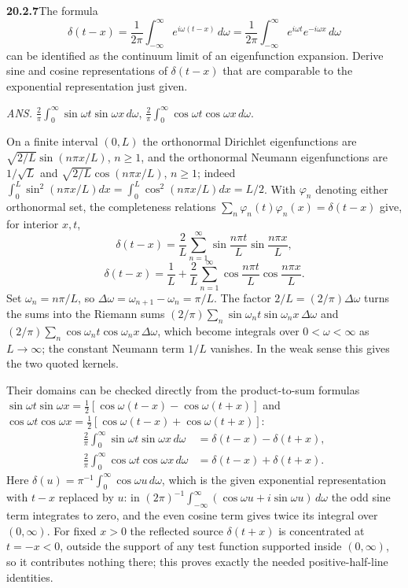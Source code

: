 \par\bigskip
\noindent\textbf{20.2.7}\quad The formula
\[
\delta(t-x)=\frac{1}{2\pi}\int_{-\infty}^{\infty}
e^{i\omega(t-x)}\,d\omega
=\frac{1}{2\pi}\int_{-\infty}^{\infty}
e^{i\omega t}e^{-i\omega x}\,d\omega
\]
can be identified as the continuum limit of an eigenfunction
expansion. Derive sine and cosine representations of $\delta(t-x)$
that are comparable to the exponential representation just given.
\par\nobreak\hfill\emph{ANS.}\enspace
$\displaystyle\frac{2}{\pi}\int_{0}^{\infty}
\sin\omega t\sin\omega x\,d\omega$,\quad
$\displaystyle\frac{2}{\pi}\int_{0}^{\infty}
\cos\omega t\cos\omega x\,d\omega$.
\par{}
\solution
On a finite interval $(0,L)$ the orthonormal Dirichlet
eigenfunctions are $\sqrt{2/L}\sin(n\pi x/L)$, $n\ge1$, and the
orthonormal Neumann eigenfunctions are $1/\sqrt L$ and
$\sqrt{2/L}\cos(n\pi x/L)$, $n\ge1$; indeed
$\int_0^L\sin^2(n\pi x/L)dx=\int_0^L\cos^2(n\pi x/L)dx=L/2$.
With $\varphi_n$ denoting either orthonormal set, the completeness
relations $\sum_n\varphi_n(t)\varphi_n(x)=\delta(t-x)$ give, for
interior $x,t$,
\[
\delta(t-x)=\frac2L\sum_{n=1}^\infty
\sin\frac{n\pi t}L\sin\frac{n\pi x}L,
\]
\[
\delta(t-x)=\frac1L+\frac2L\sum_{n=1}^\infty
\cos\frac{n\pi t}L\cos\frac{n\pi x}L.
\]
Set $\omega_n=n\pi/L$, so $\Delta\omega=\omega_{n+1}-\omega_n=\pi/L$.
The factor $2/L=(2/\pi)\Delta\omega$ turns the sums into the
Riemann sums
$(2/\pi)\sum_n\sin\omega_nt\sin\omega_nx\,\Delta\omega$ and
$(2/\pi)\sum_n\cos\omega_nt\cos\omega_nx\,\Delta\omega$, which become
integrals over $0<\omega<\infty$ as $L\to\infty$; the constant
Neumann term $1/L$ vanishes. In the weak sense this gives the two
quoted kernels.

Their domains can be checked directly from the product-to-sum
formulas
$\sin\omega t\sin\omega x=\frac12[\cos\omega(t-x)-\cos\omega(t+x)]$
and
$\cos\omega t\cos\omega x=\frac12[\cos\omega(t-x)+\cos\omega(t+x)]$:
\begin{align*}
\frac2\pi\int_0^\infty\sin\omega t\sin\omega x\,d\omega
&=\delta(t-x)-\delta(t+x),\\
\frac2\pi\int_0^\infty\cos\omega t\cos\omega x\,d\omega
&=\delta(t-x)+\delta(t+x).
\end{align*}
Here $\delta(u)=\pi^{-1}\int_0^\infty\cos\omega u\,d\omega$, which is
the given exponential representation with $t-x$ replaced by $u$:
in $(2\pi)^{-1}\int_{-\infty}^\infty(\cos\omega u+i\sin\omega u)\,d\omega$
the odd sine term integrates to zero, and the even cosine term
gives twice its integral over $(0,\infty)$.
For fixed $x>0$ the reflected source $\delta(t+x)$ is concentrated
at $t=-x<0$, outside the support of any test function supported
inside $(0,\infty)$, so it contributes nothing there; this proves
exactly the needed positive-half-line identities.

